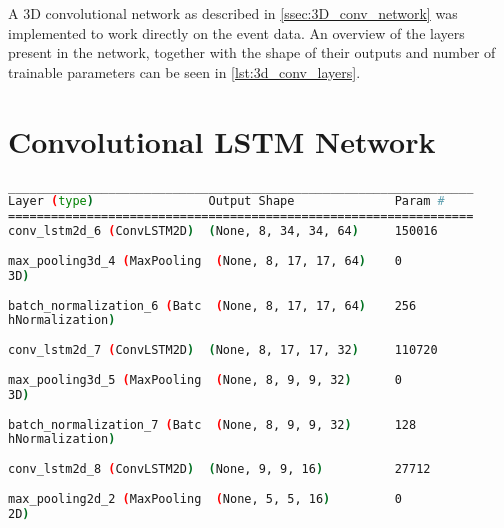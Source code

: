 A 3D convolutional network as described in \cref{ssec:3D_conv_network} was implemented to work directly on the event data. An overview of the layers present in the network, together with the shape of their outputs and number of trainable parameters can be seen in \cref{lst:3d_conv_layers}.

\section{Convolutional LSTM Network}

\begin{lstlisting}[language=Bash,caption={Overview of layers in Convolutional LTSM network},label={lst:conv_lstm_layers},numbers=none]
_________________________________________________________________
Layer (type)                Output Shape              Param #   
=================================================================
conv_lstm2d_6 (ConvLSTM2D)  (None, 8, 34, 34, 64)     150016    
                                                                
max_pooling3d_4 (MaxPooling  (None, 8, 17, 17, 64)    0         
3D)                                                             
                                                                
batch_normalization_6 (Batc  (None, 8, 17, 17, 64)    256       
hNormalization)                                                 
                                                                
conv_lstm2d_7 (ConvLSTM2D)  (None, 8, 17, 17, 32)     110720    
                                                                
max_pooling3d_5 (MaxPooling  (None, 8, 9, 9, 32)      0         
3D)                                                             
                                                                
batch_normalization_7 (Batc  (None, 8, 9, 9, 32)      128       
hNormalization)                                                 
                                                                
conv_lstm2d_8 (ConvLSTM2D)  (None, 9, 9, 16)          27712     
                                                                
max_pooling2d_2 (MaxPooling  (None, 5, 5, 16)         0         
2D)                                                             
                                                                

\end{lstlisting}
